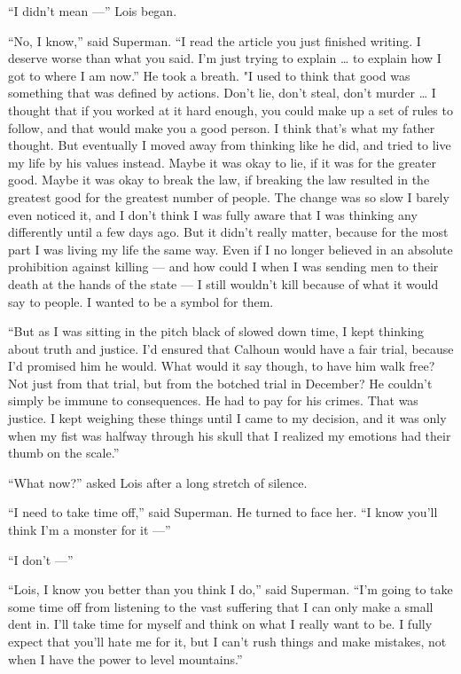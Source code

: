 ``I didn't mean ---'' Lois began.

``No, I know,'' said Superman. ``I read the article you just finished
writing. I deserve worse than what you said. I'm just trying to explain
\ldots{} to explain how I got to where I am now.'' He took a breath. "I
used to think that good was something that was defined by actions. Don't
lie, don't steal, don't murder \ldots{} I thought that if you worked at
it hard enough, you could make up a set of rules to follow, and that
would make you a good person. I think that's what my father thought. But
eventually I moved away from thinking like he did, and tried to live my
life by his values instead. Maybe it was okay to lie, if it was for the
greater good. Maybe it was okay to break the law, if breaking the law
resulted in the greatest good for the greatest number of people. The
change was so slow I barely even noticed it, and I don't think I was
fully aware that I was thinking any differently until a few days ago.
But it didn't really matter, because for the most part I was living my
life the same way. Even if I no longer believed in an absolute
prohibition against killing --- and how could I when I was sending men
to their death at the hands of the state --- I still wouldn't kill
because of what it would say to people. I wanted to be a symbol for
them.

``But as I was sitting in the pitch black of slowed down time, I kept
thinking about truth and justice. I'd ensured that Calhoun would have a
fair trial, because I'd promised him he would. What would it say though,
to have him walk free? Not just from that trial, but from the botched
trial in December? He couldn't simply be immune to consequences. He had
to pay for his crimes. That was justice. I kept weighing these things
until I came to my decision, and it was only when my fist was halfway
through his skull that I realized my emotions had their thumb on the
scale.''

``What now?'' asked Lois after a long stretch of silence.

``I need to take time off,'' said Superman. He turned to face her. ``I
know you'll think I'm a monster for it ---''

``I don't ---''

``Lois, I know you better than you think I do,'' said Superman. ``I'm
going to take some time off from listening to the vast suffering that I
can only make a small dent in. I'll take time for myself and think on
what I really want to be. I fully expect that you'll hate me for it, but
I can't rush things and make mistakes, not when I have the power to
level mountains.''

